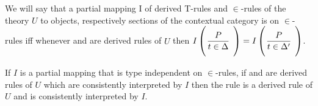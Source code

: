 \begin{definition}
We will say that a partial mapping I  
of derived T-rules and $\in$-rules of the theory $U$ to objects, respectively sections of the contextual category \catcw
is  on   $\in$-rules iff whenever
 and  are derived rules of $U$ then 
$\Imap{\gatdisplayrule{P}{\ofT{t}{\Delta}}}=\Imap{\gatdisplayrule{P}{\ofT{t}{\Delta'}}}$.
\end{definition}

\begin{lemma}
If $I$ is a partial mapping that is type independent on $\in$-rules,
if  and  are derived rules of $U$ 
which are consistently interpreted by $I$ then the rule 
is a derived rule of $U$ and is consistently interpreted by $I$.
\end{lemma}
